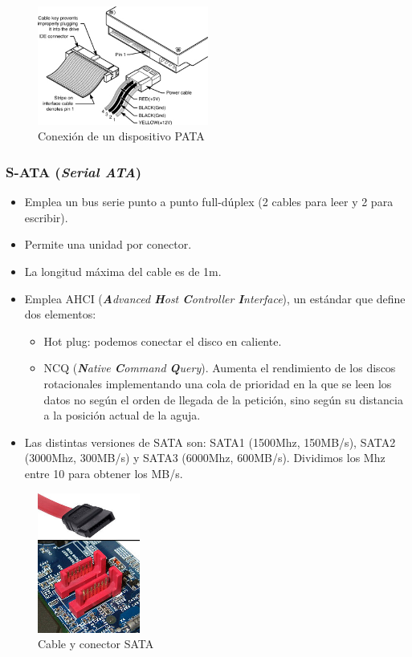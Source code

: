 \documentclass[12pt,spanish]{article}
\begin{document}
\begin{figure}[H]
	\centering
	\includegraphics[width=0.5\textwidth]{pataconnection.jpg}
	\caption{Conexión de un dispositivo PATA}
\end{figure}

\subsubsection{S-ATA (\textit{\textbf{S}erial \textbf{ATA}})}
\begin{itemize}
	\item Emplea un bus serie punto a punto full-dúplex (2 cables para leer y 2 para escribir).
	\item Permite una unidad por conector.
	\item La longitud máxima del cable es de 1m.
	\item Emplea AHCI (\textit{\textbf{A}dvanced \textbf{H}ost \textbf{C}ontroller \textbf{I}nterface}), un estándar que define dos elementos:
	\begin{itemize}
		\item Hot plug: podemos conectar el disco en caliente.
		\item NCQ (\textit{\textbf{N}ative \textbf{C}ommand \textbf{Q}uery}). Aumenta el rendimiento de los discos rotacionales implementando una cola de prioridad en la que se leen los datos no según el orden de llegada de la petición, sino según su distancia a la posición actual de la aguja.
	\end{itemize}
	\item Las distintas versiones de SATA son: SATA1 (1500Mhz, 150MB/s), SATA2 (3000Mhz, 300MB/s) y SATA3 (6000Mhz, 600MB/s). Dividimos los Mhz entre 10 para obtener los MB/s.
\end{itemize}

\begin{figure}[H]
	\centering
	\includegraphics[width=0.3\textwidth]{sata.jpg}
	\caption{Cable y conector SATA}
\end{figure}
\end{document}
